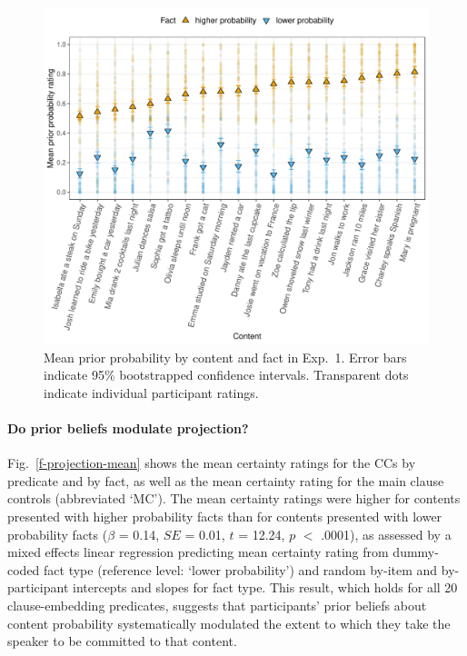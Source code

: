 \documentclass[11pt,fleqn]{article}
\newcommand{\figref}[1]{Fig.~\ref{#1}}
\newcommand{\6}{\mbox{$[\hspace*{-.6mm}[$}}
\newcommand{\9}{\mbox{$]\hspace*{-.6mm}]$}}
\begin{document}
\begin{figure}[h!]
\centering
\includegraphics[width=.7\paperwidth]{../../results/9-prior-projection/graphs/prior-ratings}

\caption{Mean prior probability by content and fact in Exp.~1. Error bars indicate 95\% bootstrapped confidence intervals. Transparent dots indicate individual participant ratings.} 
\label{f-prior}
\end{figure}

\paragraph{Do prior beliefs modulate projection?}  \figref{f-projection-mean} shows the mean certainty ratings for the CCs by  predicate and by fact, as well as the mean certainty rating for the main clause controls (abbreviated `MC'). The mean certainty ratings were higher for contents  presented with higher probability facts than for contents presented with lower probability facts ($\beta$ = 0.14, $SE$ = 0.01, $t$ = 12.24, $p$ $<$ .0001), as assessed by a mixed effects linear regression predicting mean certainty rating from dummy-coded fact type (reference level: `lower probability') and random by-item and by-participant intercepts and slopes for fact type.  This result, which holds for all 20 clause-embedding predicates, suggests that participants' prior beliefs about content probability systematically modulated the extent to which they take the speaker to be committed to that content.
\end{document}
